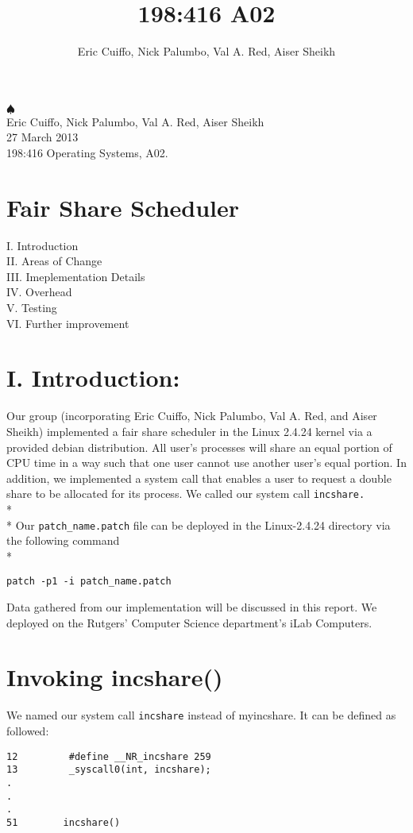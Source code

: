 \documentclass[10pt]{article}
\begin{document}
\title{198:416 A02}
\author{Eric Cuiffo, Nick Palumbo, Val A. Red, Aiser Sheikh}

\fancyhead{}
\hspace*{95pt} $\spadesuit$\\
Eric Cuiffo, Nick Palumbo, Val A. Red, Aiser Sheikh\\
27 March 2013 \\
198:416 Operating Systems, A02.
\section{Fair Share Scheduler}
I. Introduction \\
II. Areas of Change \\
III. Imeplementation Details \\
IV. Overhead \\
V.  Testing \\
VI. Further improvement

\section{I. Introduction:}

Our group (incorporating Eric Cuiffo, Nick Palumbo, Val A. Red, and Aiser Sheikh) implemented a fair 
share scheduler in the Linux 2.4.24 kernel via a provided debian distribution. 
All user's processes will share an equal portion of CPU time in a way such that one
user cannot use another user's equal portion. In addition, we implemented a system call
that enables a user to request a double share to be allocated for its process. We called
our system call \texttt{incshare.} \\* \\*
\hspace*{36pt} Our \texttt{patch\_name.patch} file can be deployed in the Linux-2.4.24 directory via the following command \\*
\begin{verbatim}
patch -p1 -i patch_name.patch
\end{verbatim}

Data gathered from our implementation will be discussed in this report. We deployed on the
Rutgers' Computer Science department's iLab Computers. 

\section{Invoking incshare()}
We named our system call \texttt{incshare} instead of myincshare. It can be defined as followed: 
\begin{verbatim}
12         #define __NR_incshare 259
13         _syscall0(int, incshare);
.
.
.
51        incshare()
\end{verbatim}
\end{document}
